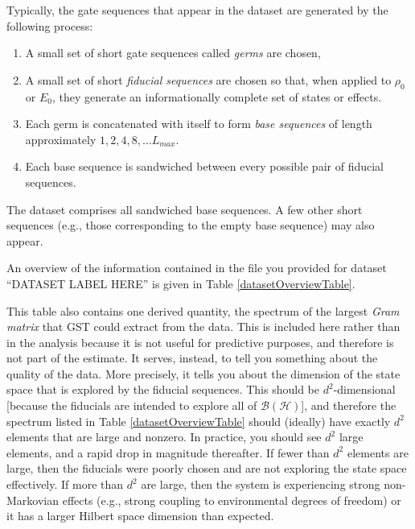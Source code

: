 \documentclass{article}[11pt]
\newcommand{\putfield}[2]{#2}
\begin{document}
Typically, the gate sequences that appear in the dataset are generated by the following process:
\begin{enumerate}
\item A small set of short gate sequences called \emph{germs} are chosen,
\item A small set of short \emph{fiducial sequences} are chosen so that, when applied to $\rho_0$ or $E_0$, they generate an informationally complete set of states or effects.
\item Each germ is concatenated with itself to form \emph{base sequences} of length approximately $1,2,4,8,\ldots L_{max}$.
\item Each base sequence is sandwiched between every possible pair of fiducial sequences.
\end{enumerate}
The dataset comprises all sandwiched base sequences.  A few other short sequences (e.g., those corresponding to the empty base sequence) may also appear.

\iftoggle{LsAndGermsSet}{ The fiducial sequences and germs for \emph{this} dataset are given in Table \ref{fiducialAndGermListTables}. }{ Fiducial sequence and germ information was not given for this report, and may not be applicable.}  An overview of the information contained in the file you provided for dataset ``\putfield{datasetLabel}{DATASET LABEL HERE}'' is given in Table \ref{datasetOverviewTable}.  

This table also contains one derived quantity, the spectrum of the largest \emph{Gram matrix} that GST could extract from the data.  This is included here rather than in the analysis because it is not useful for predictive purposes, and therefore is not part of the estimate.  It serves, instead, to tell you something about the quality of the data.  More precisely, it tells you about the dimension of the state space that is explored by the fiducial sequences.  This should be $d^2$-dimensional [because the fiducials are intended to explore all of $\mathcal{B}(\mathcal{H})$], and therefore the spectrum listed in Table \ref{datasetOverviewTable} should (ideally) have exactly $d^2$ elements that are large and nonzero.  In practice, you should see $d^2$ large elements, and a rapid drop in magnitude thereafter.  If fewer than $d^2$ elements are large, then the fiducials were poorly chosen and are not exploring the state space effectively.  If more than $d^2$ are large, then the system is experiencing strong non-Markovian effects (e.g., strong coupling to environmental degrees of freedom) or it has a larger Hilbert space dimension than expected.
\end{document}
